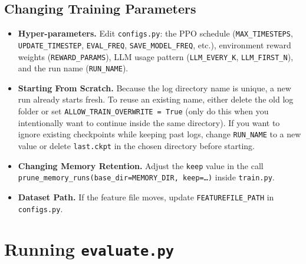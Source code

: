 \documentclass[12pt]{article}
\begin{document}
\subsection{Changing Training Parameters}
\begin{itemize}[leftmargin=1.2cm]
  \item \textbf{Hyper-parameters.} Edit \texttt{configs.py}: the PPO schedule (\texttt{MAX\_TIMESTEPS}, \texttt{UPDATE\_TIMESTEP}, \texttt{EVAL\_FREQ}, \texttt{SAVE\_MODEL\_FREQ}, etc.), environment reward weights (\texttt{REWARD\_PARAMS}), LLM usage pattern (\texttt{LLM\_EVERY\_K}, \texttt{LLM\_FIRST\_N}), and the run name (\texttt{RUN\_NAME}).
  \item \textbf{Starting From Scratch.} Because the log directory name is unique, a new run already starts fresh. To reuse an existing name, either delete the old log folder or set \texttt{ALLOW\_TRAIN\_OVERWRITE = True} (only do this when you intentionally want to continue inside the same directory). If you want to ignore existing checkpoints while keeping past logs, change \texttt{RUN\_NAME} to a new value or delete \texttt{last.ckpt} in the chosen directory before starting.
  \item \textbf{Changing Memory Retention.} Adjust the \texttt{keep} value in the call \texttt{prune\_memory\_runs(base\_dir=MEMORY\_DIR, keep=\ldots)} inside \texttt{train.py}.
  \item \textbf{Dataset Path.} If the feature file moves, update \texttt{FEATUREFILE\_PATH} in \texttt{configs.py}.
\end{itemize}

\section{Running \texttt{evaluate.py}}
\end{document}
